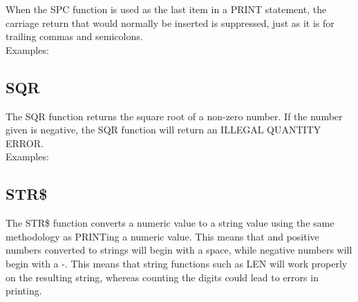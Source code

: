 When the {\ttfamily SPC} function is used as the last item in a {\ttfamily
PRINT} statement, the carriage return that would normally be inserted is
suppressed, just as it is for trailing commas and semicolons.\\

Examples:\\


\subsection{SQR}

The {\ttfamily SQR} function returns the square root of a non-zero number.  If
the number given is negative, the {\ttfamily SQR} function will return an
{\ttfamily ILLEGAL QUANTITY ERROR}.\\

Examples:\\

\subsection{STR\$}

The {\ttfamily STR\$} function converts a numeric value to a string value using
the same methodology as {\ttfamily PRINT}ing a numeric value.  This means that
{} and positive numbers converted to strings will begin with a
space, while negative numbers will begin with a {\ttfamily -}.  This means that
string functions such as {\ttfamily LEN} will work properly on the resulting
string, whereas counting the digits could lead to errors in printing.\\

